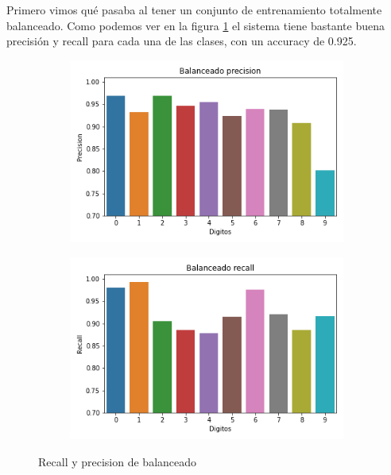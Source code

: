 Primero vimos qué pasaba al tener un conjunto de entrenamiento totalmente balanceado. Como podemos ver en la figura \ref{fig:bal_recall_prec} el sistema tiene bastante buena precisión y recall para cada una de las clases, con un accuracy de 0.925.
\begin{figure}[h]
    \centering
    \begin{subfigure}{.5\textwidth}
        \centering
        \includegraphics[width=.8\linewidth]{images/balanceo/Balanceado precision_3795.png}
    \end{subfigure}%
    \begin{subfigure}{.5\textwidth}
        \centering
        \includegraphics[width=.8\linewidth]{images/balanceo/Balanceado recall_3795.png}
    \end{subfigure}%
    \caption{Recall y precision de balanceado}
    \label{fig:bal_recall_prec}
\end{figure}

